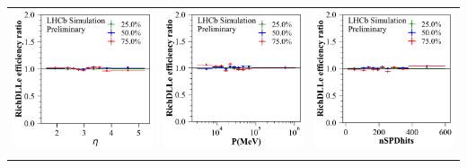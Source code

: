 \documentclass{article}
\begin{document}
\begin{tabular}{l@{\hskip -0.0in}c@{\hskip -0.0in}c}
\vspace{-0.2cm}
\includegraphics[width=0.3\linewidth]{eff_ratio_RichDLLe_vs_Brunel_ETA_at_[0.05, 0.1, 0.25, 0.5, 0.75, 0.9, 0.95].pdf} &
\includegraphics[width=0.3\linewidth]{eff_ratio_RichDLLe_vs_Brunel_P_at_[0.05, 0.1, 0.25, 0.5, 0.75, 0.9, 0.95].pdf} &
\includegraphics[width=0.3\linewidth]{eff_ratio_RichDLLe_vs_nSPDhits_at_[0.05, 0.1, 0.25, 0.5, 0.75, 0.9, 0.95].pdf} \\
\vspace{-0.2cm}


\end{tabular}
\end{document}
